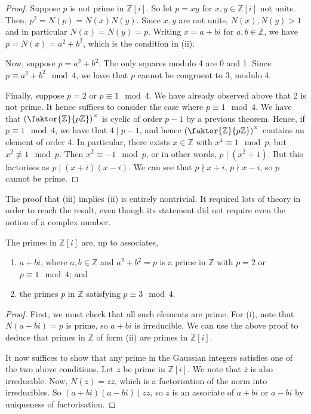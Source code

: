 \begin{proof}
	Suppose \( p \) is not prime in \( \mathbb Z[i] \).
	So let \( p = xy \) for \( x, y \in \mathbb Z[i] \) not units.
	Then, \( p^2 = N(p) = N(x)N(y) \).
	Since \( x, y \) are not units, \( N(x), N(y) > 1 \) and in particular \( N(x) = N(y) = p \).
	Writing \( x = a+bi \) for \( a, b \in \mathbb Z \), we have \( p = N(x) = a^2 + b^2 \), which is the condition in (ii).

	Now, suppose \( p = a^2 + b^2 \).
	The only squares modulo 4 are 0 and 1.
	Since \( p \equiv a^2 + b^2 \mod 4 \), we have that \( p \) cannot be congruent to 3, modulo 4.

	Finally, suppose \( p = 2 \) or \( p \equiv 1 \mod 4 \).
	We have already observed above that 2 is not prime.
	It hence suffices to consider the case where \( p \equiv 1 \mod 4 \).
	We have that \( \qty(\faktor{\mathbb Z}{p\mathbb Z})^\times \) is cyclic of order \( p-1 \) by a previous theorem.
	Hence, if \( p \equiv 1 \mod 4 \), we have that \( 4 \mid p-1 \), and hence \( \qty(\faktor{\mathbb Z}{p\mathbb Z})^\times \) contains an element of order 4.
	In particular, there exists \( x \in \mathbb Z \) with \( x^4 \equiv 1 \mod p \), but \( x^2 \not\equiv 1 \mod p \).
	Then \( x^2 \equiv -1 \mod p \), or in other words, \( p \mid (x^2 + 1) \).
	But this factorises as \( p \mid (x+i)(x-i) \).
	We can see that \( p \nmid x+i \), \( p \nmid x-i \), so \( p \) cannot be prime.
\end{proof}
\begin{remark}
	The proof that (iii) implies (ii) is entirely nontrivial.
	It required lots of theory in order to reach the result, even though its statement did not require even the notion of a complex number.
\end{remark}
\begin{theorem}
	The primes in \( \mathbb Z[i] \) are, up to associates,
	\begin{enumerate}
		\item \( a + bi \), where \( a, b \in \mathbb Z \) and \( a^2 + b^2 = p \) is a prime in \( \mathbb Z \) with \( p = 2 \) or \( p \equiv 1 \mod 4 \); and
		\item the primes \( p \) in \( \mathbb Z \) satisfying \( p \equiv 3 \mod 4 \).
	\end{enumerate}
\end{theorem}
\begin{proof}
	First, we must check that all such elements are prime.
	For (i), note that \( N(a+bi) = p \) is prime, so \( a+bi \) is irreducible.
	We can use the above proof to deduce that primes in \( \mathbb Z \) of form (ii) are primes in \( \mathbb Z[i] \).

	It now suffices to show that any prime in the Gaussian integers satisfies one of the two above conditions.
	Let \( z \) be prime in \( \mathbb Z[i] \).
	We note that \( \overline z \) is also irreducible.
	Now, \( N(z) = z\overline z \), which is a factorisation of the norm into irreducibles.
	So \( (a+bi)(a-bi) \mid z \overline z \), so \( z \) is an associate of \( a+bi \) or \( a-bi \) by uniqueness of factorisation.
\end{proof}
